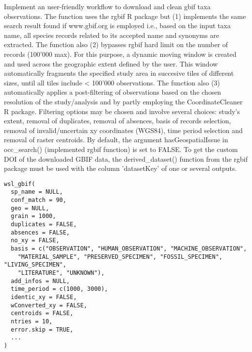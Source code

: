\documentclass[a4paper]{book}
\begin{document}
%
\begin{Description}\relax
Implement an user-friendly workflow to download and clean gbif taxa observations.
The function uses the rgbif R package but (1) implements the same search result 
found if www.gbif.org is employed i.e., based on the input taxa name, all species
records related to its accepted name and synonyms are extracted. The function
also (2) bypasses rgbif hard limit on the number of records (100'000 max).
For this purpose, a dynamic moving window is created and used across the geographic
extent defined by the user. This window automatically fragments the specified
study area in succesive tiles of different sizes, until all tiles include < 100'000
observations. The function also (3) automatically applies a post-filtering of
observations based on the chosen resolution of the study/analysis and by partly
employing the CoordinateCleaner R package. Filtering options may be chosen and
involve several choices: study's extent, removal of duplicates, removal of absences,
basis of records selection, removal of invalid/uncertain xy coordinates (WGS84), time
period selection and removal of raster centroids. By default, the argument
hasGeospatialIssue in occ\_search() (implemented rgbif function) is set to FALSE.
To get the custom DOI of the downloaded GBIF data, the derived\_dataset() function
from the rgbif package must be used with the column 'datasetKey' of one or several
outputs.
\end{Description}
%
\begin{Usage}
\begin{verbatim}
wsl_gbif(
  sp_name = NULL,
  conf_match = 90,
  geo = NULL,
  grain = 1000,
  duplicates = FALSE,
  absences = FALSE,
  no_xy = FALSE,
  basis = c("OBSERVATION", "HUMAN_OBSERVATION", "MACHINE_OBSERVATION",
    "MATERIAL_SAMPLE", "PRESERVED_SPECIMEN", "FOSSIL_SPECIMEN", "LIVING_SPECIMEN",
    "LITERATURE", "UNKNOWN"),
  add_infos = NULL,
  time_period = c(1000, 3000),
  identic_xy = FALSE,
  wConverted_xy = FALSE,
  centroids = FALSE,
  ntries = 10,
  error.skip = TRUE,
  ...
)
\end{verbatim}
\end{Usage}
%
\end{document}
